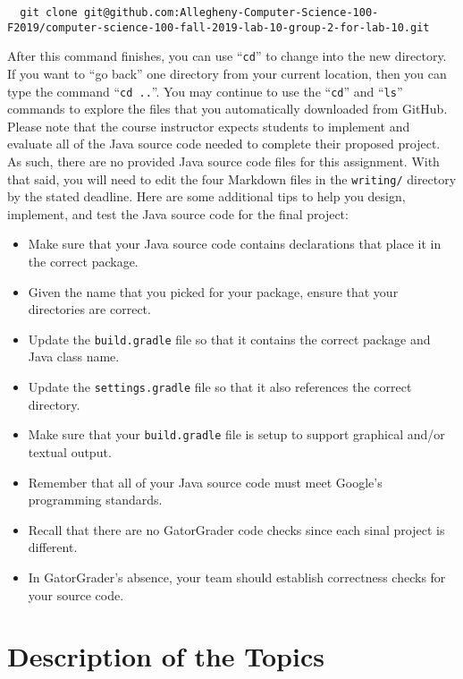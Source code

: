 \documentclass[11pt]{article}
\newcommand{\command}[1]{``\lstinline{#1}''}
\newcommand{\program}[1]{\lstinline{#1}}
\newcommand{\step}[1]{``{#1}''}
\begin{document}
\begin{lstlisting}
  git clone git@github.com:Allegheny-Computer-Science-100-F2019/computer-science-100-fall-2019-lab-10-group-2-for-lab-10.git
\end{lstlisting}

After this command finishes, you can use \command{cd} to change into the new
directory. If you want to \step{go back} one directory from your current
location, then you can type the command \command{cd ..}. You may continue to use
the \command{cd} and \command{ls} commands to explore the files that you
automatically downloaded from GitHub. Please note that the course instructor
expects students to implement and evaluate all of the Java source code needed to
complete their proposed project. As such, there are no provided Java source code
files for this assignment. With that said, you will need to edit the four
Markdown files in the \program{writing/} directory by the stated deadline. Here
are some additional tips to help you design, implement, and test the Java source
code for the final project:

\begin{itemize}
  \item Make sure that your Java source code contains declarations that place it in the correct package.
  \item Given the name that you picked for your package, ensure that your directories are correct.
  \item Update the \program{build.gradle} file so that it contains the correct package and Java class name.
  \item Update the \program{settings.gradle} file so that it also references the correct directory.
  \item Make sure that your \program{build.gradle} file is setup to support graphical and/or textual output.
  \item Remember that all of your Java source code must meet Google's programming standards.
  \item Recall that there are no GatorGrader code checks since each sinal project is different.
  \item In GatorGrader's absence, your team should establish correctness checks for your source code.
\end{itemize}

\section*{Description of the Topics}
\end{document}
